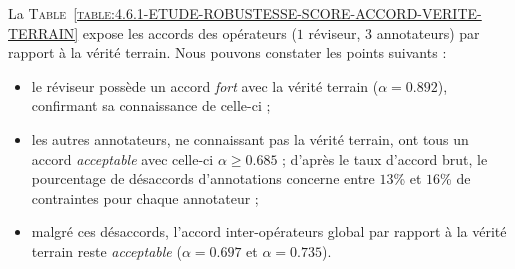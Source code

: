 			La \textsc{Table~\ref{table:4.6.1-ETUDE-ROBUSTESSE-SCORE-ACCORD-VERITE-TERRAIN}} expose les accords des opérateurs ($1$ réviseur, $3$ annotateurs) par rapport à la vérité terrain.
			Nous pouvons constater les points suivants :
			\begin{itemize}
				\item le réviseur possède un accord \textit{fort} avec la vérité terrain ($\alpha = 0.892$), confirmant sa connaissance de celle-ci ;
				\item les autres annotateurs, ne connaissant pas la vérité terrain, ont tous un accord \textit{acceptable} avec celle-ci $\alpha \geq 0.685$ ; d'après le taux d'accord brut, le pourcentage de désaccords d'annotations concerne entre $13$\% et $16$\% de contraintes pour chaque annotateur ;
				\item malgré ces désaccords, l'accord inter-opérateurs global par rapport à la vérité terrain reste \textit{acceptable} ($\alpha = 0.697$ et $\alpha = 0.735$).
			\end{itemize}
			

